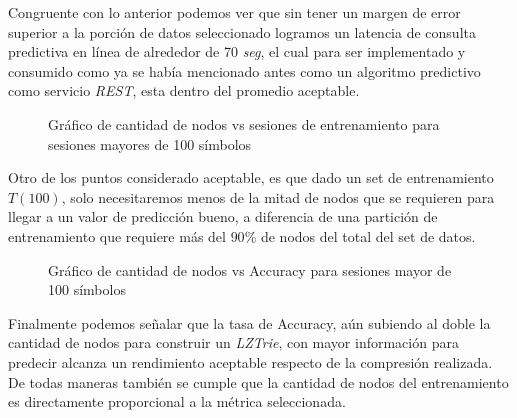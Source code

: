 	Congruente con lo anterior podemos ver que sin tener un margen de error superior a la porción de datos seleccionado logramos un latencia de consulta predictiva en línea de alrededor de 70 \emph{seg}, el cual para ser implementado y consumido como ya se había mencionado antes como un algoritmo predictivo como servicio \emph{REST}, esta dentro del promedio aceptable.

	\begin{figure}[h] 
		\centering
		\caption{Gráfico de cantidad de nodos vs sesiones de entrenamiento para sesiones mayores de 100 símbolos}
	  \label{fig:sim}
	\end{figure}


	Otro de los puntos  considerado aceptable, es que dado un set de entrenamiento $T(100)$, solo necesitaremos menos de la mitad de nodos que se requieren para llegar a un valor de predicción bueno, a diferencia de una partición de entrenamiento que requiere más del $90\%$ de nodos del total del set de datos.\\
	


\begin{figure}[h] 
	\centering
		\caption{Gráfico de cantidad de nodos vs Accuracy para sesiones mayor de 100 símbolos}
	\label{fig:sim}
\end{figure}



	Finalmente podemos señalar que la tasa de Accuracy, aún  subiendo al doble la cantidad de nodos para construir un \emph{LZTrie}, con mayor información  para predecir alcanza un rendimiento aceptable respecto de la compresión realizada. De todas maneras también se cumple que la cantidad de nodos del entrenamiento es directamente proporcional a la métrica seleccionada.